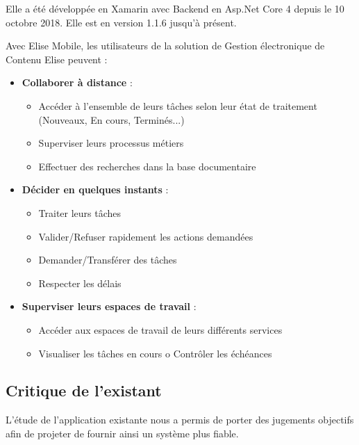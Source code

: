 Elle a été développée en Xamarin avec Backend en Asp.Net Core 4 depuis le 10 octobre 2018. Elle est en version 1.1.6 jusqu'à présent.

Avec Elise Mobile, les utilisateurs de la solution de Gestion électronique de Contenu Elise peuvent :

\begin{itemize}

\item \textbf{Collaborer à distance} : 
  \begin{itemize}
  \item Accéder à l'ensemble de leurs tâches selon leur état de traitement (Nouveaux, En cours, Terminés...)
  \item Superviser leurs processus métiers
  \item Effectuer des recherches dans la base documentaire
  \end{itemize}
\item \textbf{Décider en quelques instants} :
  \begin{itemize}
  \item Traiter leurs tâches
  \item Valider/Refuser rapidement les actions demandées
  \item Demander/Transférer des tâches
  \item Respecter les délais
  \end{itemize}
\item \textbf{Superviser leurs espaces de travail} :
  \begin{itemize}
    \item Accéder aux espaces de travail de leurs différents services
    \item Visualiser les tâches en cours o Contrôler les échéances
  \end{itemize}
\end{itemize}

\subsection{Critique de l'existant}
L'étude de l'application existante nous a permis de porter des jugements objectifs afin de projeter de fournir ainsi un système plus fiable.

